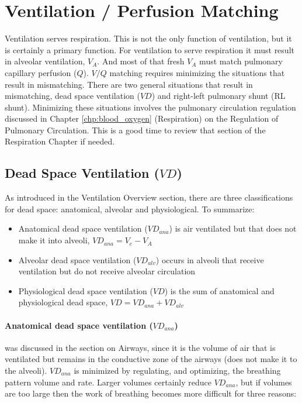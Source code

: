 \section{Ventilation / Perfusion Matching}

Ventilation serves respiration. This is not the only function of ventilation, but it is certainly a primary function. For ventilation to serve respiration it must result in alveolar ventilation, $V_A$. And most of that fresh $V_A$ must match pulmonary capillary perfusion ($Q$). $V/Q$ matching requires minimizing the situations that result in mismatching. There are two general situations that result in mismatching, dead space ventilation ($VD$) and right-left pulmonary shunt (RL shunt). Minimizing these situations involves the pulmonary circulation regulation discussed in Chapter \ref{chp:blood_oxygen} (Respiration) on the Regulation of Pulmonary Circulation. This is a good time to review that section of the Respiration Chapter if needed.

\subsection{Dead Space Ventilation ($VD$)}

As introduced in the Ventilation Overview section, there are three classifications for dead space: anatomical, alveolar and physiological.  
\vspace{3mm}
To summarize:
\begin{itemize}
       \item Anatomical dead space ventilation ($VD_{ana}$) is air ventilated but that does not make it into alveoli, $VD_{ana} = V_e - V_A$
    \item Alveolar dead space ventilation ($VD_{alv}$) occurs in alveoli that receive ventilation but do not receive alveolar circulation
    \item Physiological dead space ventilation ($VD$) is the sum of anatomical and physiological dead space, $VD = VD_{ana} + VD_{alv}$
\end{itemize}

\paragraph{Anatomical dead space ventilation ($VD_{ana}$)} was discussed in the section on Airways, since it is the volume of air that is ventilated but remains in the conductive zone of the airways (does not make it to the alveoli). $VD_{ana}$ is minimized by regulating, and optimizing, the breathing pattern volume and rate. Larger volumes certainly reduce $VD_{ana}$, but if volumes are too large then the work of breathing becomes more difficult for three reasons:

